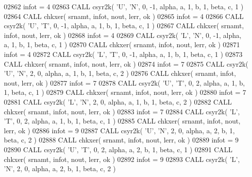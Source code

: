 \begin{DoxyCode}
02862       infot = 4
02863       \textcolor{keyword}{CALL }csyr2k( \textcolor{stringliteral}{'U'}, \textcolor{stringliteral}{'N'}, 0, -1, alpha, a, 1, b, 1, beta, c, 1 )
02864       \textcolor{keyword}{CALL }chkxer( srnamt, infot, nout, lerr, ok )
02865       infot = 4
02866       \textcolor{keyword}{CALL }csyr2k( \textcolor{stringliteral}{'U'}, \textcolor{stringliteral}{'T'}, 0, -1, alpha, a, 1, b, 1, beta, c, 1 )
02867       \textcolor{keyword}{CALL }chkxer( srnamt, infot, nout, lerr, ok )
02868       infot = 4
02869       \textcolor{keyword}{CALL }csyr2k( \textcolor{stringliteral}{'L'}, \textcolor{stringliteral}{'N'}, 0, -1, alpha, a, 1, b, 1, beta, c, 1 )
02870       \textcolor{keyword}{CALL }chkxer( srnamt, infot, nout, lerr, ok )
02871       infot = 4
02872       \textcolor{keyword}{CALL }csyr2k( \textcolor{stringliteral}{'L'}, \textcolor{stringliteral}{'T'}, 0, -1, alpha, a, 1, b, 1, beta, c, 1 )
02873       \textcolor{keyword}{CALL }chkxer( srnamt, infot, nout, lerr, ok )
02874       infot = 7
02875       \textcolor{keyword}{CALL }csyr2k( \textcolor{stringliteral}{'U'}, \textcolor{stringliteral}{'N'}, 2, 0, alpha, a, 1, b, 1, beta, c, 2 )
02876       \textcolor{keyword}{CALL }chkxer( srnamt, infot, nout, lerr, ok )
02877       infot = 7
02878       \textcolor{keyword}{CALL }csyr2k( \textcolor{stringliteral}{'U'}, \textcolor{stringliteral}{'T'}, 0, 2, alpha, a, 1, b, 1, beta, c, 1 )
02879       \textcolor{keyword}{CALL }chkxer( srnamt, infot, nout, lerr, ok )
02880       infot = 7
02881       \textcolor{keyword}{CALL }csyr2k( \textcolor{stringliteral}{'L'}, \textcolor{stringliteral}{'N'}, 2, 0, alpha, a, 1, b, 1, beta, c, 2 )
02882       \textcolor{keyword}{CALL }chkxer( srnamt, infot, nout, lerr, ok )
02883       infot = 7
02884       \textcolor{keyword}{CALL }csyr2k( \textcolor{stringliteral}{'L'}, \textcolor{stringliteral}{'T'}, 0, 2, alpha, a, 1, b, 1, beta, c, 1 )
02885       \textcolor{keyword}{CALL }chkxer( srnamt, infot, nout, lerr, ok )
02886       infot = 9
02887       \textcolor{keyword}{CALL }csyr2k( \textcolor{stringliteral}{'U'}, \textcolor{stringliteral}{'N'}, 2, 0, alpha, a, 2, b, 1, beta, c, 2 )
02888       \textcolor{keyword}{CALL }chkxer( srnamt, infot, nout, lerr, ok )
02889       infot = 9
02890       \textcolor{keyword}{CALL }csyr2k( \textcolor{stringliteral}{'U'}, \textcolor{stringliteral}{'T'}, 0, 2, alpha, a, 2, b, 1, beta, c, 1 )
02891       \textcolor{keyword}{CALL }chkxer( srnamt, infot, nout, lerr, ok )
02892       infot = 9
02893       \textcolor{keyword}{CALL }csyr2k( \textcolor{stringliteral}{'L'}, \textcolor{stringliteral}{'N'}, 2, 0, alpha, a, 2, b, 1, beta, c, 2 )

\end{DoxyCode}
